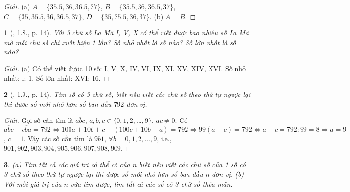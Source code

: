 \documentclass{article}
\newtheorem{baitoan}{}
\begin{document}
\begin{proof}[Giải]
	(a) $A = \{35.5,36,36.5,37\}$, $B = \{35.5,36,36.5,37\}$, $C = \{35,35.5,36,36.5,37\}$, $D = \{35,35.5,36,37\}$. (b) $A = B$.
\end{proof}

\begin{baitoan}[\cite{Binh_boi_duong_Toan_6_tap_1}, 1.8., p. 14]
	Với 3 chữ số La Mã I, V, X có thể viết được bao nhiêu số La Mã mà mỗi chữ số chỉ xuất hiện 1 lần? Số nhỏ nhất là số nào? Số lớn nhất là số nào?
\end{baitoan}

\begin{proof}[Giải]
	(a) Có thể viết được 10 số: I, V, X, IV, VI, IX, XI, XV, XIV, XVI. Số nhỏ nhất: I: 1. Số lớn nhất: XVI: 16.
\end{proof}

\begin{baitoan}[\cite{Binh_boi_duong_Toan_6_tap_1}, 1.9., p. 14]
	Tìm số có 3 chữ số, biết nếu viết các chữ số theo thứ tự ngược lại thì được số mới nhỏ hơn số ban đầu $792$ đơn vị.
\end{baitoan}

\begin{proof}[Giải]
	Gọi số cần tìm là $\overline{abc}$, $a,b,c\in\{0,1,2,\ldots,9\}$, $ac\ne0$. Có $\overline{abc} - \overline{cba} = 792\Leftrightarrow100a + 10b + c - (100c + 10b + a) = 792\Leftrightarrow99(a - c) = 792\Leftrightarrow a - c = 792:99 = 8\Rightarrow a = 9$, $c = 1$. Vậy các số cần tìm là $\overline{9b1}$, $\forall b = 0,1,2,\ldots,9$, i.e., $901,902,903,904,905,906,907,908,909$.
\end{proof}

\begin{baitoan}
	(a) Tìm tất cả các giá trị có thể có của $n$ biết nếu viết các chữ số của 1 số có 3 chữ số theo thứ tự ngược lại thì được số mới nhỏ hơn số ban đầu $n$ đơn vị. (b) Với mỗi giá trị của $n$ vừa tìm được, tìm tất cả các số có 3 chữ số thỏa mãn.
\end{baitoan}
\end{document}
